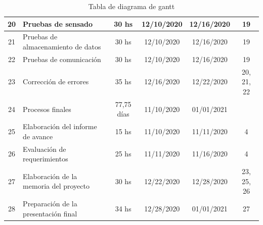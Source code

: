 \documentclass[11pt]{charter}
\begin{document}
\begin{table}[htpb]
\begin{tabularx}{\linewidth}{@{}|c|X|c|c|c|c|@{}}
20 & Pruebas de sensado &  30 hs & 12/10/2020 & 	12/16/2020 & 19\\ \hline
21 & Pruebas de almacenamiento de datos & 30 hs & 12/10/2020 & 	12/16/2020 &19\\ \hline
22 & Pruebas de comunicación & 30 hs & 12/10/2020 & 	12/16/2020 & 19\\ \hline
23 & Corrección de errores &  35 hs & 12/16/2020 & 	12/22/2020 &20, 21, 22\\ \hline
24 & Procesos finales &  77,75 días & 11/10/2020 & 	01/01/2021 & \\ \hline
25 & Elaboración del informe de avance &  15 hs & 11/10/2020 & 	11/11/2020 & 4\\ \hline
26 & Evaluación de requerimientos &  25 hs & 11/11/2020 & 	11/16/2020 & 4\\ \hline
27 & Elaboración de la memoria del proyecto &  30 hs & 12/22/2020 & 	12/28/2020 & 23, 25, 26\\ \hline
28 & Preparación de la presentación final &  34 hs &12/28/2020 & 	01/01/2021 &  27\\ 
\hline
\end{tabularx}%
\caption{Tabla de diagrama de gantt}
\label{tab:gantt}
\end{table}
\end{document}
